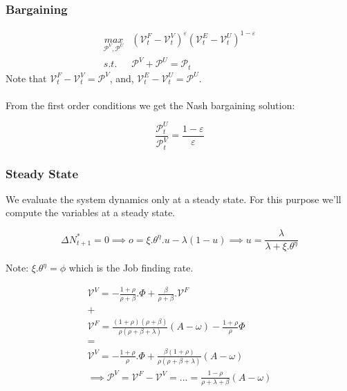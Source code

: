 \subsubsection{Bargaining}
\begin{equation*}
\begin{aligned}
    \underset{{\mathcal{P}^{V}},\mathcal{P}^{U}}{max} & (\mathcal{V}_{t}^{F}-\mathcal{V}_{t}^{V})^{\varepsilon}(\mathcal{V}_{t}^{E}-\mathcal{V}_{t}^{U})^{1-\varepsilon} \\
    s.t. & \mathcal{P}^{V}+\mathcal{P}^{U}=\mathcal{P}_{t}
\end{aligned}
\end{equation*}
Note that $\mathcal{V}_{t}^{F}-\mathcal{V}_{t}^{V}=\mathcal{P}^{V}$, and, $\mathcal{V}_{t}^{E}-\mathcal{V}_{t}^{U}=\mathcal{P}^{U}$.
\paragraph{} 
From the first order conditions we get the Nash bargaining solution: 

\begin{equation}\label{Nas_Barg_Solution}
    \frac{\mathcal{P}_{t}^{U}}{\mathcal{P}_{t}^{V}}=\frac{1-\varepsilon}{\varepsilon}
\end{equation}

\subsubsection{Steady State}
We evaluate the system dynamics only at a steady state. For this purpose we'll compute the variables at a steady state. 

\begin{equation*}
    \Delta N_{t+1}^{*}=0 \implies o=\xi . \theta^{\eta}.u-\lambda(1-u) \implies u=\frac{\lambda}{\lambda + \xi.\theta^{\eta}}
\end{equation*}

Note: $\xi.\theta^{\eta}=\phi$ which is the Job finding rate. 

\begin{equation*}
\begin{aligned}
    \mathcal{V}^{V}=-\frac{1+\rho}{\rho+\beta}.\Phi+\frac{\beta}{\rho+\beta}.\mathcal{V}^{F} \\
    + \\
    \mathcal{V}^{F}=\frac{(1+\rho)(\rho+\beta)}{\rho(\rho+\beta+\lambda)}(A-\omega)-\frac{1+\rho}{\rho}\Phi \\ 
    = \\
    \mathcal{V}^{V}=-\frac{1+\rho}{\rho}.\Phi+\frac{\beta(1+\rho)}{\rho(\rho+\beta+\lambda)}(A-\omega) \\
   \implies \mathcal{P}^{V}=\mathcal{V}^{F}-\mathcal{V}^{V}=...=\frac{1-\rho}{\rho+\lambda+\beta}(A-\omega)
\end{aligned}
\end{equation*}

